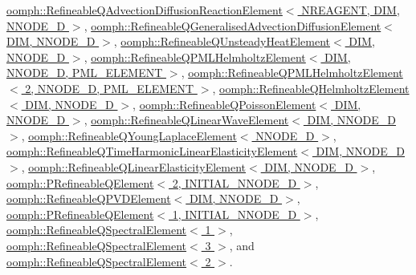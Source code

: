\hyperlink{classoomph_1_1RefineableQAdvectionDiffusionReactionElement_ac659fcbaab375aad151052eecf353c2a}{oomph\+::\+Refineable\+Q\+Advection\+Diffusion\+Reaction\+Element$<$ N\+R\+E\+A\+G\+E\+N\+T, D\+I\+M, N\+N\+O\+D\+E\+\_\+D $>$}, \hyperlink{classoomph_1_1RefineableQGeneralisedAdvectionDiffusionElement_ac246ca3a3238407f40fe56bc2fd449bb}{oomph\+::\+Refineable\+Q\+Generalised\+Advection\+Diffusion\+Element$<$ D\+I\+M, N\+N\+O\+D\+E\+\_\+D $>$}, \hyperlink{classoomph_1_1RefineableQUnsteadyHeatElement_add4a7e0089818e439e156d1ed7c9fd6f}{oomph\+::\+Refineable\+Q\+Unsteady\+Heat\+Element$<$ D\+I\+M, N\+N\+O\+D\+E\+\_\+D $>$}, \hyperlink{classoomph_1_1RefineableQPMLHelmholtzElement_a27b1fabd3fcd677628035f2a8e2175f7}{oomph\+::\+Refineable\+Q\+P\+M\+L\+Helmholtz\+Element$<$ D\+I\+M, N\+N\+O\+D\+E\+\_\+D, P\+M\+L\+\_\+\+E\+L\+E\+M\+E\+N\+T $>$}, \hyperlink{classoomph_1_1RefineableQPMLHelmholtzElement_a27b1fabd3fcd677628035f2a8e2175f7}{oomph\+::\+Refineable\+Q\+P\+M\+L\+Helmholtz\+Element$<$ 2, N\+N\+O\+D\+E\+\_\+D, P\+M\+L\+\_\+\+E\+L\+E\+M\+E\+N\+T $>$}, \hyperlink{classoomph_1_1RefineableQHelmholtzElement_a962ab14f0f212d41772775fb8bb73c1a}{oomph\+::\+Refineable\+Q\+Helmholtz\+Element$<$ D\+I\+M, N\+N\+O\+D\+E\+\_\+D $>$}, \hyperlink{classoomph_1_1RefineableQPoissonElement_abb65373718eab9b04a0eb5786ae6559c}{oomph\+::\+Refineable\+Q\+Poisson\+Element$<$ D\+I\+M, N\+N\+O\+D\+E\+\_\+D $>$}, \hyperlink{classoomph_1_1RefineableQLinearWaveElement_a4af9a35f433a96aec249cd77a7cd43ee}{oomph\+::\+Refineable\+Q\+Linear\+Wave\+Element$<$ D\+I\+M, N\+N\+O\+D\+E\+\_\+D $>$}, \hyperlink{classoomph_1_1RefineableQYoungLaplaceElement_a2a8efe3d30e165de70aad77536bf55c9}{oomph\+::\+Refineable\+Q\+Young\+Laplace\+Element$<$ N\+N\+O\+D\+E\+\_\+D $>$}, \hyperlink{classoomph_1_1RefineableQTimeHarmonicLinearElasticityElement_ab7ae9c5375153806dbc28f38ad5b06f4}{oomph\+::\+Refineable\+Q\+Time\+Harmonic\+Linear\+Elasticity\+Element$<$ D\+I\+M, N\+N\+O\+D\+E\+\_\+D $>$}, \hyperlink{classoomph_1_1RefineableQLinearElasticityElement_a700c92182b25ecdda8c4454efd347c58}{oomph\+::\+Refineable\+Q\+Linear\+Elasticity\+Element$<$ D\+I\+M, N\+N\+O\+D\+E\+\_\+D $>$}, \hyperlink{classoomph_1_1PRefineableQElement_3_012_00_01INITIAL__NNODE__1D_01_4_a53d48e7e3310a02a315562ed628bd4b5}{oomph\+::\+P\+Refineable\+Q\+Element$<$ 2, I\+N\+I\+T\+I\+A\+L\+\_\+\+N\+N\+O\+D\+E\+\_\+D $>$}, \hyperlink{classoomph_1_1RefineableQPVDElement_abf45607aefbc031ce918757010564d26}{oomph\+::\+Refineable\+Q\+P\+V\+D\+Element$<$ D\+I\+M, N\+N\+O\+D\+E\+\_\+D $>$}, \hyperlink{classoomph_1_1PRefineableQElement_3_011_00_01INITIAL__NNODE__1D_01_4_a6c2918a2f7a1aa009ae2378132cea6f1}{oomph\+::\+P\+Refineable\+Q\+Element$<$ 1, I\+N\+I\+T\+I\+A\+L\+\_\+\+N\+N\+O\+D\+E\+\_\+D $>$}, \hyperlink{classoomph_1_1RefineableQSpectralElement_3_011_01_4_a7a5d6ced6c1c327f779e456303908c0e}{oomph\+::\+Refineable\+Q\+Spectral\+Element$<$ 1 $>$}, \hyperlink{classoomph_1_1RefineableQSpectralElement_3_013_01_4_a57a4a5ac247be0030de74d6ca7f5bdab}{oomph\+::\+Refineable\+Q\+Spectral\+Element$<$ 3 $>$}, and \hyperlink{classoomph_1_1RefineableQSpectralElement_3_012_01_4_a46a713943b11c207d06a677bfe1cf162}{oomph\+::\+Refineable\+Q\+Spectral\+Element$<$ 2 $>$}.



